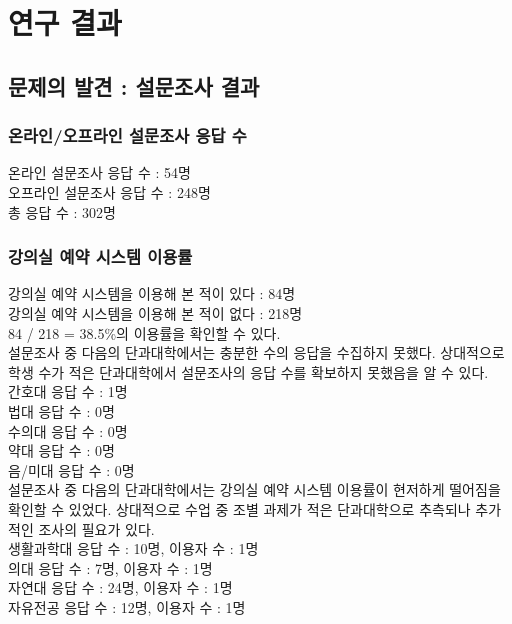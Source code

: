 \documentclass[11pt,a4paper]{article}
\begin{document}
\section{연구 결과}

\subsection{문제의 발견 : 설문조사 결과}

\subsubsection{온라인/오프라인 설문조사 응답 수}
온라인 설문조사 응답 수 : 54명\\
오프라인 설문조사 응답 수 : 248명\\
총 응답 수 : 302명

\subsubsection{강의실 예약 시스템 이용률}
강의실 예약 시스템을 이용해 본 적이 있다 : 84명\\
강의실 예약 시스템을 이용해 본 적이 없다 : 218명\\
84 / 218 = 38.5\%의 이용률을 확인할 수 있다.\\
\hfill\break
설문조사 중 다음의 단과대학에서는 충분한 수의 응답을 수집하지 못했다. 상대적으로 학생 수가 적은 단과대학에서 설문조사의 응답 수를 확보하지 못했음을 알 수 있다.\\
간호대 응답 수 : 1명\\
법대 응답 수 : 0명\\
수의대 응답 수 : 0명\\
약대 응답 수 : 0명\\
음/미대 응답 수 : 0명\\
\hfill\break
설문조사 중 다음의 단과대학에서는 강의실 예약 시스템 이용률이 현저하게 떨어짐을 확인할 수 있었다. 상대적으로 수업 중 조별 과제가 적은 단과대학으로 추측되나 추가적인 조사의 필요가 있다.\\
생활과학대 응답 수 : 10명, 이용자 수 : 1명\\
의대 응답 수 : 7명, 이용자 수 : 1명\\
자연대 응답 수 : 24명, 이용자 수 : 1명\\
자유전공 응답 수 : 12명, 이용자 수 : 1명
\end{document}
